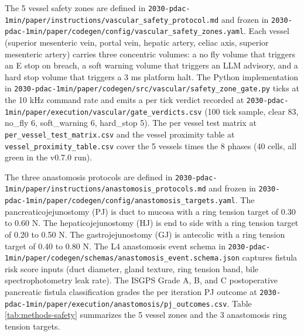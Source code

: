 The 5 vessel safety zones are defined in
\texttt{2030-pdac-1min/paper/instructions/vascular_safety_protocol.md}
and frozen in
\texttt{2030-pdac-1min/paper/codegen/config/vascular_safety_zones.yaml}.
Each vessel (superior mesenteric vein, portal vein, hepatic
artery, celiac axis, superior mesenteric artery) carries three
concentric volumes: a no fly volume that triggers an E stop on
breach, a soft warning volume that triggers an LLM advisory, and a
hard stop volume that triggers a 3 ms platform halt. The Python
implementation in
\texttt{2030-pdac-1min/paper/codegen/src/vascular/safety_zone_gate.py}
ticks at the 10 kHz command rate and emits a per tick verdict
recorded at
\texttt{2030-pdac-1min/paper/execution/vascular/gate_verdicts.csv}
(100 tick sample, clear 83, no_fly 6, soft_warning 6, hard_stop
5). The per vessel test matrix at \texttt{per_vessel_test_matrix.csv}
and the vessel proximity table at \texttt{vessel_proximity_table.csv}
cover the 5 vessels times the 8 phases (40 cells, all green in
the v0.7.0 run).

The three anastomosis protocols are defined in
\texttt{2030-pdac-1min/paper/instructions/anastomosis_protocols.md}
and frozen in
\texttt{2030-pdac-1min/paper/codegen/config/anastomosis_targets.yaml}.
The pancreaticojejunostomy (PJ) is duct to mucosa with a ring
tension target of 0.30 to 0.60 N. The hepaticojejunostomy (HJ) is
end to side with a ring tension target of 0.20 to 0.50 N. The
gastrojejunostomy (GJ) is antecolic with a ring tension target of
0.40 to 0.80 N. The L4 anastomosis event schema in
\texttt{2030-pdac-1min/paper/codegen/schemas/anastomosis_event.schema.json}
captures fistula risk score inputs (duct diameter, gland texture,
ring tension band, bile spectrophotometry leak rate). The ISGPS
Grade A, B, and C postoperative pancreatic fistula classification
\cite{Bassi2017ISGPSPostOpFistula} grades the per iteration PJ
outcome at
\texttt{2030-pdac-1min/paper/execution/anastomosis/pj_outcomes.csv}.
Table \ref{tab:methods-safety} summarizes the 5 vessel zones and
the 3 anastomosis ring tension targets.

